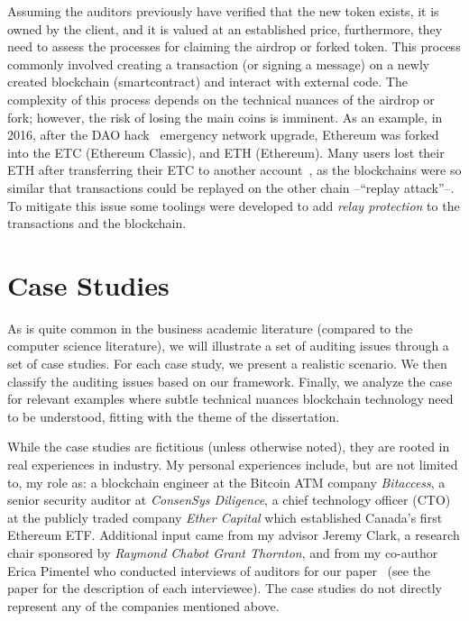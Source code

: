 Assuming the auditors previously have verified that the new token exists, it is owned by the client, and it is valued at an established price, furthermore, they need to assess the processes for claiming the airdrop or forked token. This process commonly involved creating a transaction (or signing a message) on a newly created blockchain (smartcontract) and interact with external code. The complexity of this process depends on the technical nuances of the airdrop or fork; however, the risk of losing the main coins is imminent. As an example, in 2016, after the DAO hack~\cite{siegel2016daohack} emergency network upgrade, Ethereum was forked into the ETC (Ethereum Classic), and ETH (Ethereum). Many users lost their ETH after transferring their ETC to another account~\cite{ethereumClassic}, as the blockchains were so similar that transactions could be replayed on the other chain --``replay attack''--. To mitigate this issue some toolings were developed to add \textit{relay protection} to the transactions and the blockchain. 





\section{Case Studies} \label{sec:auditing:case-studies}

As is quite common in the business academic literature (compared to the computer science literature), we will illustrate a set of auditing issues through a set of case studies.  For each case study, we present a realistic scenario. We then classify the auditing issues based on our framework. Finally, we analyze the case for relevant examples where subtle technical nuances blockchain technology need to be understood, fitting with the theme of the dissertation.

While the case studies are fictitious (unless otherwise noted), they are rooted in real experiences in industry. My personal experiences include, but are not limited to, my role as: a blockchain engineer at the Bitcoin ATM company \textit{Bitaccess}, a senior security auditor at \textit{ConsenSys Diligence}, a chief technology officer (CTO) at the publicly traded company \textit{Ether Capital} which established Canada's first Ethereum ETF. Additional input came from my advisor Jeremy Clark, a research chair sponsored by \textit{Raymond Chabot Grant Thornton}, and from my co-author Erica Pimentel who conducted interviews of auditors for our paper~\cite{pimentel2021systemizing} (see the paper for the description of each interviewee). The case studies do not directly represent any of the companies mentioned above.


